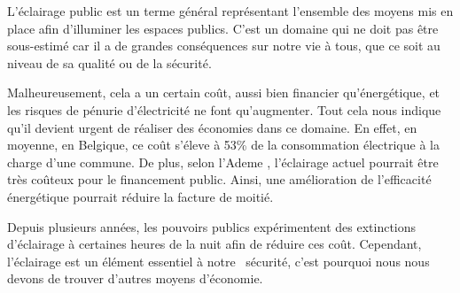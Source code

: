 

L'\'eclairage public est un terme g\'en\'eral repr\'esentant l'ensemble des moyens mis en place afin d'illuminer les espaces publics. C'est un domaine qui ne doit pas \^etre sous-estim\'e car il a de grandes cons\'equences sur notre vie \`a tous, que ce soit au niveau de sa qualit\'e ou de la s\'ecurit\'e. \cite{projwebsite}


Malheureusement, cela a un certain co\^ut, aussi bien financier qu'\'energ\'etique, et  les risques de p\'enurie d'\'electricit\'e ne font qu'augmenter. Tout cela nous indique qu'il devient urgent de r\'ealiser des \'economies dans ce domaine. En effet, en moyenne, en Belgique, ce co\^ut  s'\'eleve \`a 53\% de la consommation \'electrique \`a la charge d'une commune. De plus, selon l'Ademe \cite{ademe}, l'\'eclairage actuel pourrait \^etre tr\`es co\^uteux pour le financement public. Ainsi, une am\'elioration de l'efficacit\'e \'energ\'etique pourrait r\'eduire la facture de moiti\'e.


Depuis plusieurs ann\'ees, les pouvoirs publics exp\'erimentent des extinctions d'\'eclairage \`a certaines heures de la nuit afin de r\'eduire ces co\^ut. Cependant, l'\'eclairage est un élément essentiel \`a notre \ s\'ecurit\'e, c'est pourquoi nous nous devons de trouver d'autres moyens d'\'economie.
